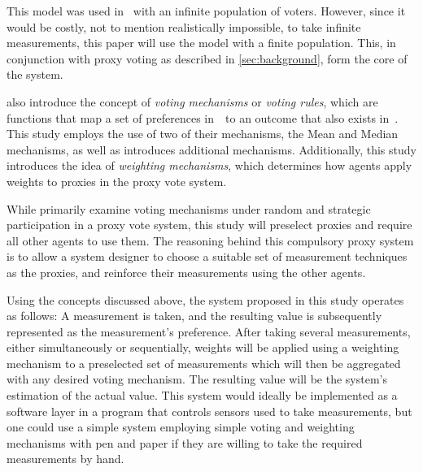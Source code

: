 This model was used in~\cite{Cohensius2017} with an infinite population of voters.
However, since it would be costly, not to mention realistically impossible, to take
infinite measurements, this paper will use the model with a finite population.
This, in conjunction with proxy voting as described in \autoref{sec:background}, form
the core of the system.


 also introduce the concept of \textit{voting mechanisms} or
\textit{voting rules}, which are functions that map a set of preferences
in~\systemspace\ to an outcome that also exists in~\systemspace.
%
%
This study employs the use of two of their mechanisms, the Mean and Median
mechanisms, as well as introduces additional mechanisms.
Additionally, this study introduces the idea of \textit{weighting mechanisms}, which
determines how agents apply weights to proxies in the proxy vote system.
%

While  primarily examine voting mechanisms under random and strategic
participation in a proxy vote system, this study will preselect proxies and require
all other agents to use them.
The reasoning behind this compulsory proxy system is to allow a system designer to
choose a suitable set of measurement techniques as the proxies, and reinforce their
measurements using the other agents.
%

Using the concepts discussed above, the system proposed in this study
operates as follows:
A measurement is taken, and the resulting value is subsequently represented as the
measurement's preference.
After taking several measurements, either simultaneously or sequentially, weights will
be applied using a weighting mechanism to a preselected set of measurements which
will then be aggregated with any desired voting mechanism.
The resulting value will be the system's estimation of the actual value.
This system would ideally be implemented as a software layer in a program that
controls sensors used to take measurements, but one could use a simple system employing
simple voting and weighting mechanisms with pen and paper if they are willing to take
the required measurements by hand.



